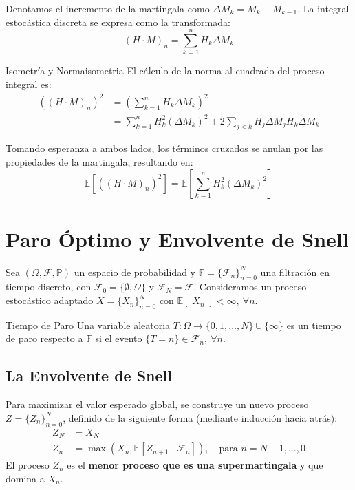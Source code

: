 \documentclass[10pt,a4paper]{article}
\begin{document}
Denotamos el incremento de la martingala como $\Delta M_k = M_k - M_{k-1}$. La integral estocástica discreta se expresa como la transformada:
\[ (H \cdot M)_n = \sum_{k=1}^n H_k \Delta M_k \]

\begin{mytheo}{Isometría y Norma}{isometria}
El cálculo de la norma al cuadrado del proceso integral es:
\begin{align*}
    ((H \cdot M)_n)^2 &= \left( \sum_{k=1}^n H_k \Delta M_k \right)^2 \\
    &= \sum_{k=1}^n H_k^2 (\Delta M_k)^2 + 2 \sum_{j < k} H_j \Delta M_j H_k \Delta M_k
\end{align*}

Tomando esperanza a ambos lados, los términos cruzados se anulan por las propiedades de la martingala, resultando en:
\[ \mathbb{E}[((H \cdot M)_n)^2] = \mathbb{E}\left[ \sum_{k=1}^n H_k^2 (\Delta M_k)^2 \right] \]
\end{mytheo}


\section{Paro Óptimo y Envolvente de Snell}

Sea $(\Omega, \mathcal{F}, \mathbb{P})$ un espacio de probabilidad y $\mathbb{F} = \{\mathcal{F}_n\}_{n=0}^N$ una filtración en tiempo discreto, con $\mathcal{F}_0 = \{\emptyset, \Omega\}$ y $\mathcal{F}_N = \mathcal{F}$. Consideramos un proceso estocástico adaptado $X = \{X_n\}_{n=0}^N$ con $\mathbb{E}[|X_n|] < \infty, \ \forall n$.

\begin{nota}{Tiempo de Paro}
Una variable aleatoria $T: \Omega \to \{0, 1, \dots, N\} \cup \{\infty\}$ es un tiempo de paro respecto a $\mathbb{F}$ si el evento $\{T=n\} \in \mathcal{F}_n, \ \forall n$.
\end{nota}

\subsection{La Envolvente de Snell}
Para maximizar el valor esperado global, se construye un nuevo proceso $Z = \{Z_n\}_{n=0}^N$, definido de la siguiente forma (mediante inducción hacia atrás):
\begin{align*}
    Z_N &= X_N \\
    Z_n &= \max(X_n, \mathbb{E}[Z_{n+1} \mid \mathcal{F}_n]), \quad \text{para } n = N-1, \dots, 0
\end{align*}
El proceso $Z_n$ es el \textbf{menor proceso que es una supermartingala} y que domina a $X_n$.
\end{document}
